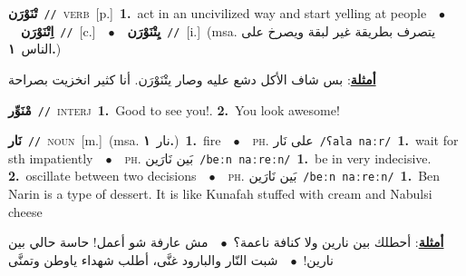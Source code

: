 \documentclass[10pt,a4paper,twoside]{article} %
\begin{document}
\begin{multicols}{2}
{\setlength\topsep{0pt}\textbf{\foreignlanguage{arabic}{تْنَوْرَن}}\ {\color{gray}\texttt{//}\color{black}}\ \textsc{verb}\ [p.]\ \textbf{1.}~act in an uncivilized way and start yelling at people\ \ $\bullet$\ \ \setlength\topsep{0pt}\textbf{\foreignlanguage{arabic}{اِتْنَوْرَن}}\ {\color{gray}\texttt{//}\color{black}}\ [c.]\ \ $\bullet$\ \ \setlength\topsep{0pt}\textbf{\foreignlanguage{arabic}{يِتْنَوْرَن}}\ {\color{gray}\texttt{//}\color{black}}\ [i.]\ \color{gray}(msa. \foreignlanguage{arabic}{يتصرف بطريقة غير لبقة ويصرخ على الناس}~\foreignlanguage{arabic}{\textbf{١.}})\color{black}\  \begin{flushright}\color{gray}\foreignlanguage{arabic}{\textbf{\underline{\foreignlanguage{arabic}{أمثلة}}}: بس شاف الأكل دشع عليه وصار يتْنَوْرَن. أنا كثير انخزيت بصراحة}\end{flushright}\color{black}} \vspace{2mm}

{\setlength\topsep{0pt}\textbf{\foreignlanguage{arabic}{مْنَوِّر}}\ {\color{gray}\texttt{//}\color{black}}\ \textsc{interj}\ \textbf{1.}~Good to see you!.  \textbf{2.}~You look awesome!\ } \vspace{2mm}

{\setlength\topsep{0pt}\textbf{\foreignlanguage{arabic}{نَار}}\ {\color{gray}\texttt{//}\color{black}}\ \textsc{noun}\ [m.]\ \color{gray}(msa. \foreignlanguage{arabic}{نار}~\foreignlanguage{arabic}{\textbf{١.}})\color{black}\ \textbf{1.}~fire\ \ $\bullet$\ \ \textsc{ph.} \color{gray} \foreignlanguage{arabic}{على نَار}\color{black}\ {\color{gray}\texttt{/{\sffamily ʕala naːr}/}\color{black}}\ \textbf{1.}~wait for sth impatiently\ \ $\bullet$\ \ \textsc{ph.} \color{gray} \foreignlanguage{arabic}{بَين نَارَين}\color{black}\ {\color{gray}\texttt{/{\sffamily beːn naːreːn}/}\color{black}}\ \textbf{1.}~be in very indecisive.  \textbf{2.}~oscillate between two decisions\ \ $\bullet$\ \ \textsc{ph.} \color{gray} \foreignlanguage{arabic}{بَين نَارَين}\color{black}\ {\color{gray}\texttt{/{\sffamily beːn naːreːn}/}\color{black}}\ \textbf{1.}~Ben Narin is a type of dessert. It is like Kunafah stuffed with cream and Nabulsi cheese\  \begin{flushright}\color{gray}\foreignlanguage{arabic}{\textbf{\underline{\foreignlanguage{arabic}{أمثلة}}}: أحطلك بين نارين ولا كنافة ناعمة؟\ $\bullet$\ \  مش عارفة شو أعمل! حاسة حالي بين نارين!\ $\bullet$\ \  شبت النّار والبارود غنَّى، أطلب شهداء ياوطن وتمنَّى}\end{flushright}\color{black}} \vspace{2mm}


\end{multicols}
\end{document}
